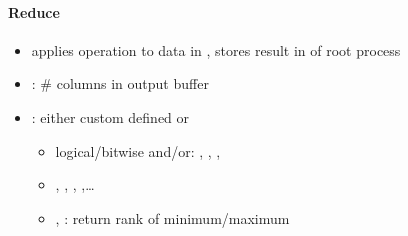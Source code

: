 \paragraph{Reduce}
\begin{itemize}
  \item applies operation to data in , stores result in  of root process
  \item {}: \# columns in output buffer
  \item {}: either custom defined or
  \begin{itemize}
    \item logical/bitwise and/or: , , , 
    \item {}, , , ,\dots
    \item {}, : return rank of minimum/maximum
  \end{itemize}
\end{itemize}